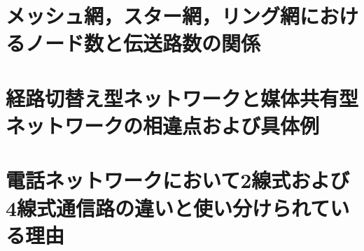 \documentclass[10.5pt]{jsarticle}
\begin{document}
\section{メッシュ網，スター網，リング網におけるノード数と伝送路数の関係}

\section{経路切替え型ネットワークと媒体共有型ネットワークの相違点および具体例}
\section{電話ネットワークにおいて2線式および4線式通信路の違いと使い分けられている理由}
\section{}
\section{}
\section{}
\section{}
\section{}
\section{}
\end{document}

